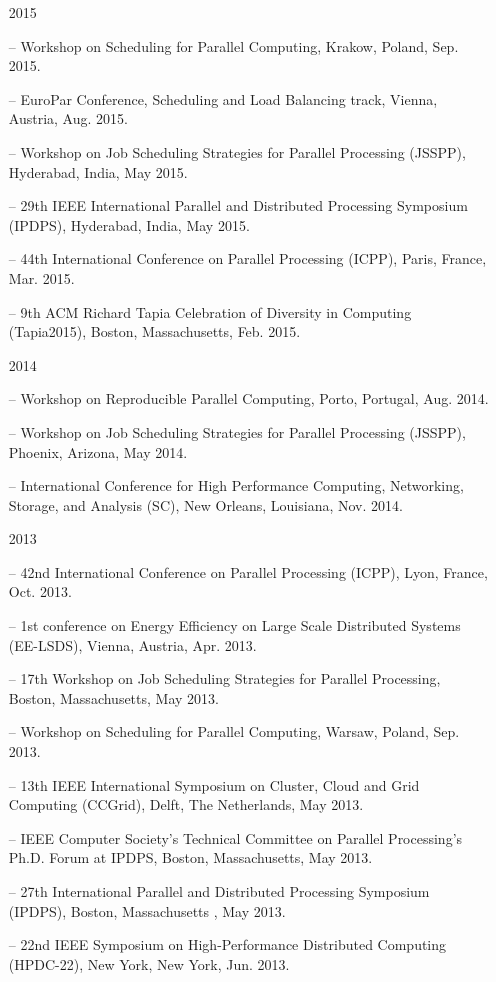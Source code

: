 \documentclass[times,11pt]{letter}
\begin{document}
\begin{itemize}
\item [2015]
\item[--]  Workshop on Scheduling for Parallel Computing, Krakow, Poland, Sep. 2015.
\item[--]  EuroPar Conference, Scheduling and Load Balancing track, Vienna, Austria, Aug. 2015.
\item[--]  Workshop on Job Scheduling Strategies for Parallel Processing (JSSPP), Hyderabad, India, May 2015.
\item[--]  29th IEEE International Parallel and Distributed Processing Symposium (IPDPS), Hyderabad, India, May 2015.
\item[--] 44th International Conference on Parallel Processing (ICPP),  Paris, France, Mar. 2015.
\item[--]  9th ACM Richard Tapia Celebration of Diversity in Computing (Tapia2015), Boston, Massachusetts, Feb. 2015.

\item [2014]
\item[--]  Workshop on Reproducible Parallel Computing, Porto, Portugal,
Aug. 2014.
\item[--]  Workshop on Job Scheduling Strategies for Parallel Processing (JSSPP), Phoenix, Arizona, May 2014.
\item[--]  International Conference for High Performance Computing, Networking, Storage, and Analysis (SC), New Orleans, Louisiana, Nov. 2014.

\item [2013]
\item[--] 42nd International Conference on Parallel Processing (ICPP),  Lyon, France, Oct. 2013.
\item[--] 1st conference on Energy Efficiency on Large Scale Distributed Systems (EE-LSDS), Vienna, Austria, Apr. 2013.
\item[--] 17th Workshop on Job Scheduling Strategies for Parallel Processing, Boston, Massachusetts, May 2013.
\item[--] Workshop on Scheduling for Parallel Computing, Warsaw, Poland, Sep. 2013.
\item[--]  13th IEEE International Symposium on Cluster, Cloud and Grid
Computing (CCGrid), Delft, The Netherlands, May 2013.
\item[--]  IEEE Computer Society's Technical Committee on Parallel Processing's Ph.D. Forum at IPDPS, Boston, Massachusetts, May 2013.
\item[--]  27th International Parallel and Distributed Processing Symposium (IPDPS), Boston, Massachusetts , May 2013.
\item[--]  22nd IEEE Symposium on High-Performance Distributed Computing (HPDC-22), New York, New York, Jun. 2013. 


\end{itemize}
\end{document}
